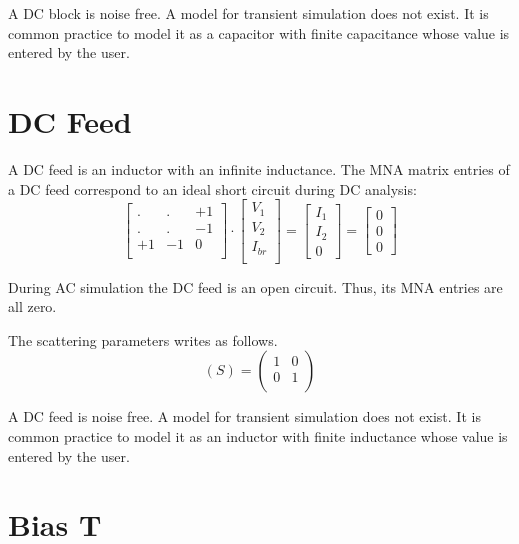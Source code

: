 A DC block is noise free. A model for transient simulation does not
exist. It is common practice to model it as a capacitor with finite
capacitance whose value is entered by the user.


\section{DC Feed}

A DC feed is an inductor with an infinite inductance. The MNA
matrix entries of a DC feed correspond to an ideal short
circuit during DC analysis:
\begin{equation}
\begin{bmatrix}
. & . & +1\\
. & . & -1\\
+1 & -1 & 0\\
\end{bmatrix}
\cdot
\begin{bmatrix}
V_1\\
V_2\\
I_{br}\\
\end{bmatrix}
=
\begin{bmatrix}
I_1\\
I_2\\
0
\end{bmatrix}
=
\begin{bmatrix}
0\\
0\\
0
\end{bmatrix}
\end{equation}

During AC simulation the DC feed is an open circuit. Thus, its MNA
entries are all zero.

\addvspace{12pt}

The scattering parameters writes as follows.
\begin{equation}
(S) =
\begin{pmatrix}
1 & 0\\
0 & 1\\
\end{pmatrix}
\end{equation}

A DC feed is noise free. A model for transient simulation does not
exist. It is common practice to model it as an inductor with finite
inductance whose value is entered by the user.


\section{Bias T}

